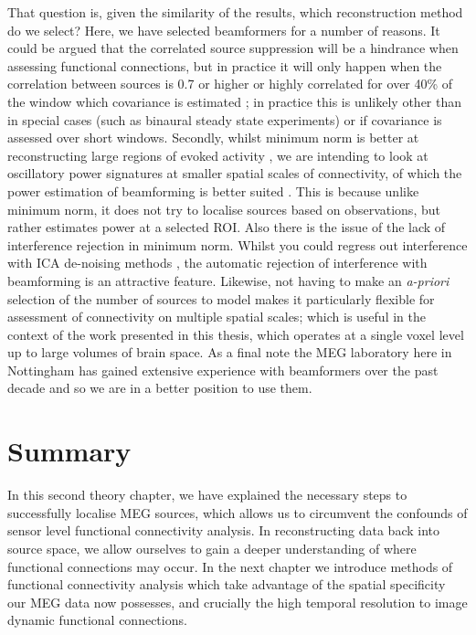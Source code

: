 That question is, given the similarity of the results, which reconstruction method do we select? Here, we have selected beamformers for a number of reasons. It could be argued that the correlated source suppression will be a hindrance when assessing functional connections, but in practice it will only happen when the correlation between sources is 0.7 or higher \citep{VanVeen1997} or highly correlated for over 40\% of the window which covariance is estimated \citep{Hadjipapas2005}; in practice this is unlikely other than in special cases (such as binaural steady state experiments) or if covariance is assessed over short windows. Secondly, whilst minimum norm is better at reconstructing large regions of evoked activity \citep{Ou2009}, we are intending to look at oscillatory power signatures at smaller spatial scales of connectivity, of which the power estimation of beamforming is better suited \citep{Jensen2010}. This is because unlike minimum norm, it does not try to localise sources based on observations, but rather estimates power at a selected ROI. Also there is the issue of the lack of interference rejection in minimum norm. Whilst you could regress out interference with ICA de-noising methods \citep{Mantini2007}, the automatic rejection of interference with beamforming is an attractive feature. Likewise, not having to make an \textit{a-priori} selection of the number of sources to model makes it particularly flexible for assessment of connectivity on multiple spatial scales; which is useful in the context of the work presented in this thesis, which operates at a single voxel level up to large volumes of brain space. As a final note the MEG laboratory here in Nottingham has gained extensive experience with beamformers over the past decade \citep{Brookes2005,Brookes2007,Brookes2008,Zumer2010,Stevenson2011,Brookes2011a} and so we are in a better position to use them.
\clearpage

\section*{Summary}

In this second theory chapter, we have explained the necessary steps to successfully localise MEG sources, which allows us to circumvent the confounds of sensor level functional connectivity analysis. In reconstructing data back into source space, we allow ourselves to gain a deeper understanding of where functional connections may occur. In the next chapter we introduce methods of functional connectivity analysis which take advantage of the spatial specificity our MEG data now possesses, and crucially the high temporal resolution to image dynamic functional connections.  